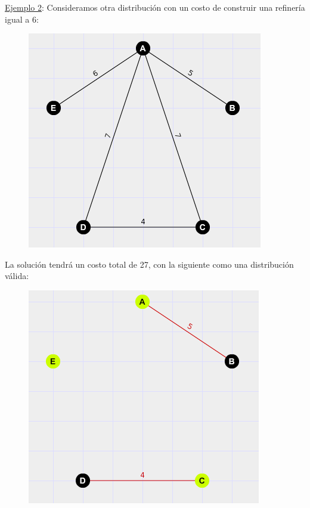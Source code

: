 \newpage

	\underline{Ejemplo 2}: Consideramos otra distribuci\'on con un costo de construir una refiner\'ia igual a 6:
	
  \begin{figure}[h!]
   \begin{center}
 	\includegraphics[scale=0.7]{imagenes/ej3/arbolCICLO.png}
   \end{center}
 \end{figure}
	
	La soluci\'on tendr\'a un costo total de 27, con la siguiente como una distribuci\'on v\'alida:

	
  \begin{figure}[h!]
   \begin{center}
 	\includegraphics[scale=0.7]{imagenes/ej3/arbolLISTO.png}
   \end{center}
 \end{figure}

